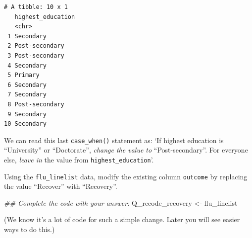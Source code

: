 \documentclass[
  letterpaper,
  DIV=11,
  numbers=noendperiod]{scrreprt}
\newenvironment{Shaded}{\begin{snugshade}}{\end{snugshade}}
\newcommand{\DocumentationTok}[1]{\textcolor[rgb]{0.37,0.37,0.37}{\textit{#1}}}
\newcommand{\NormalTok}[1]{\textcolor[rgb]{0.00,0.23,0.31}{#1}}
\newcommand{\OtherTok}[1]{\textcolor[rgb]{0.00,0.23,0.31}{#1}}
\begin{document}
\begin{verbatim}
# A tibble: 10 x 1
   highest_education
   <chr>            
 1 Secondary        
 2 Post-secondary   
 3 Post-secondary   
 4 Secondary        
 5 Primary          
 6 Secondary        
 7 Secondary        
 8 Post-secondary   
 9 Secondary        
10 Secondary        
\end{verbatim}

We can read this last \texttt{case\_when()} statement as: `If highest
education is ``University'' or ``Doctorate'', \emph{change the value to}
``Post-secondary''. For everyone else, \emph{leave in} the value from
\texttt{highest\_education}'.

\begin{tcolorbox}[enhanced jigsaw, colframe=quarto-callout-tip-color-frame, rightrule=.15mm, opacityback=0, breakable, coltitle=black, colbacktitle=quarto-callout-tip-color!10!white, bottomrule=.15mm, leftrule=.75mm, toprule=.15mm, arc=.35mm, bottomtitle=1mm, colback=white, left=2mm, opacitybacktitle=0.6, titlerule=0mm, title=\textcolor{quarto-callout-tip-color}{\faLightbulb}\hspace{0.5em}{Practice}, toptitle=1mm]

Using the \texttt{flu\_linelist} data, modify the existing column
\texttt{outcome} by replacing the value ``Recover'' with ``Recovery''.

\begin{Shaded}
\begin{Highlighting}[]
\DocumentationTok{\#\# Complete the code with your answer:}
\NormalTok{Q\_recode\_recovery }\OtherTok{\textless{}{-}} 
\NormalTok{  flu\_linelist }
\end{Highlighting}
\end{Shaded}

(We know it's a lot of code for such a simple change. Later you will see
easier ways to do this.)

\end{tcolorbox}
\end{document}
